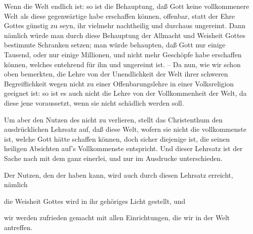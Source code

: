 \begin{aufza}
\begin{aufzb}
\item Wenn die Welt endlich ist: so ist die Behauptung, daß Gott keine vollkommenere Welt als diese gegenwärtige habe erschaffen können, offenbar, statt der Ehre Gottes günstig zu seyn, ihr vielmehr nachtheilig und durchaus ungereimt. Dann nämlich würde man durch diese Behauptung der Allmacht und Weisheit Gottes bestimmte Schranken setzen; man würde behaupten, daß Gott nur einige Tausend, oder nur einige Millionen, und nicht mehr Geschöpfe habe erschaffen können, welches entehrend für ihn und ungereimt ist. -- Da nun, wie wir schon oben bemerkten, die Lehre von der Unendlichkeit der Welt ihrer schweren Begreiflichkeit wegen nicht zu einer Offenbarungslehre in einer Volksreligion geeignet ist: so ist es auch nicht die Lehre von der Vollkommenheit der Welt, da diese jene voraussetzt, wenn sie nicht schädlich werden soll.
\item Um aber den Nutzen des  nicht zu verlieren, stellt das Christenthum den ausdrücklichen Lehrsatz auf, daß diese Welt, wofern sie nicht die vollkommenste ist, welche Gott hätte schaffen können, doch sicher diejenige ist, die seinen heiligen Absichten auf's Vollkommenste entspricht. Und dieser Lehrsatz ist der Sache nach mit dem  ganz einerlei, und nur im Ausdrucke unterschieden.\par
Der Nutzen, den der  haben kann, wird auch durch diesen Lehrsatz erreicht, nämlich
\begin{aufzc}
\item die Weisheit Gottes wird in ihr gehöriges Licht gestellt, und
\item wir werden zufrieden gemacht mit allen Einrichtungen, die wir in der Welt antreffen.~
\end{aufzc}
\end{aufzb}
\end{aufza}

